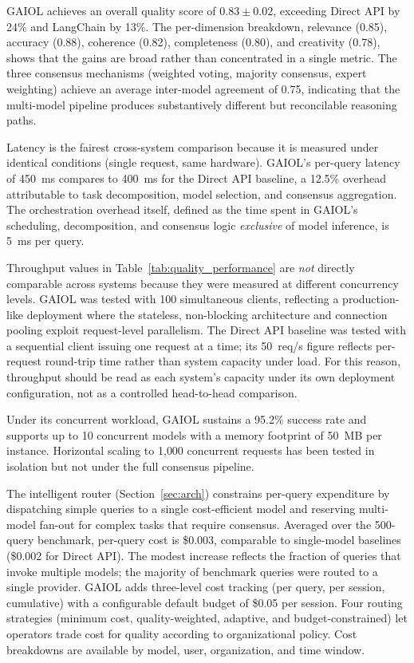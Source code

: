 \documentclass{iopjournal}
\begin{document}
GAIOL achieves an overall quality score of $0.83 \pm 0.02$, exceeding Direct API by 24\% and LangChain by 13\%. The per-dimension breakdown, relevance (0.85), accuracy (0.88), coherence (0.82), completeness (0.80), and creativity (0.78), shows that the gains are broad rather than concentrated in a single metric. The three consensus mechanisms (weighted voting, majority consensus, expert weighting) achieve an average inter-model agreement of 0.75, indicating that the multi-model pipeline produces substantively different but reconcilable reasoning paths.

\label{sec:perf}
Latency is the fairest cross-system comparison because it is measured under identical conditions (single request, same hardware). GAIOL's per-query latency of 450~ms compares to 400~ms for the Direct API baseline, a 12.5\% overhead attributable to task decomposition, model selection, and consensus aggregation. The orchestration overhead itself, defined as the time spent in GAIOL's scheduling, decomposition, and consensus logic \emph{exclusive} of model inference, is 5~ms per query.

Throughput values in Table~\ref{tab:quality_performance} are \emph{not} directly comparable across systems because they were measured at different concurrency levels. GAIOL was tested with 100 simultaneous clients, reflecting a production-like deployment where the stateless, non-blocking architecture and connection pooling exploit request-level parallelism. The Direct API baseline was tested with a sequential client issuing one request at a time; its 50~req/s figure reflects per-request round-trip time rather than system capacity under load. For this reason, throughput should be read as each system's capacity under its own deployment configuration, not as a controlled head-to-head comparison.

Under its concurrent workload, GAIOL sustains a 95.2\% success rate and supports up to 10 concurrent models with a memory footprint of 50~MB per instance. Horizontal scaling to 1{,}000 concurrent requests has been tested in isolation but not under the full consensus pipeline.

The intelligent router (Section~\ref{sec:arch}) constrains per-query expenditure by dispatching simple queries to a single cost-efficient model and reserving multi-model fan-out for complex tasks that require consensus. Averaged over the 500-query benchmark, per-query cost is \$0.003, comparable to single-model baselines (\$0.002 for Direct API). The modest increase reflects the fraction of queries that invoke multiple models; the majority of benchmark queries were routed to a single provider. GAIOL adds three-level cost tracking (per query, per session, cumulative) with a configurable default budget of \$0.05 per session. Four routing strategies (minimum cost, quality-weighted, adaptive, and budget-constrained) let operators trade cost for quality according to organizational policy. Cost breakdowns are available by model, user, organization, and time window.
\end{document}
